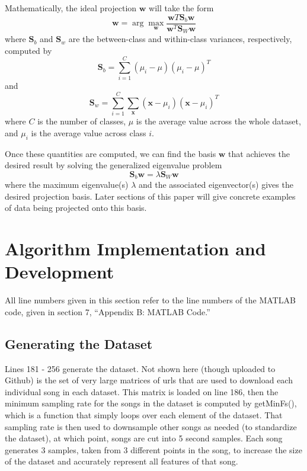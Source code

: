 \documentclass[a4paper,10 pt]{article}
\begin{document}
Mathematically, the ideal projection $\mathbf{w}$ will take the form 
\begin{equation}
    \mathbf{w} = \arg\max_{\mathbf{w}} \frac{\mathbf{w}T\mathbf{S}_b\mathbf{w}}{\mathbf{w}^T\mathbf{S}_W\mathbf{w}}
\end{equation}
where $\mathbf{S}_b$ and $\mathbf{S}_w$ are the between-class and within-class variances, respectively, computed by
\begin{equation}
    \mathbf{S}_b = \sum_{i=1}^C (\mu_i - \mu)(\mu_i - \mu)^T
\end{equation}
and 
\begin{equation}
    \mathbf{S}_w = \sum_{i=1}^C \sum_{\mathbf{x}}(\mathbf{x}-\mu_i)(\mathbf{x}-\mu_i)^T
\end{equation}
where $C$ is the number of classes, $\mu$ is the average value across the whole dataset, and $\mu_i$ is the average value across class $i$.

Once these quantities are computed, we can find the basis $\mathbf{w}$ that achieves the desired result by solving the generalized eigenvalue problem 
\begin{equation}
    \mathbf{S}_b\mathbf{w}=\lambda\mathbf{S}_W\mathbf{w}
\end{equation}
where the maximum eigenvalue(s) $\lambda$ and the associated eigenvector(s) gives the desired projection basis. Later sections of this paper will give concrete examples of data being projected onto this basis.


\section{Algorithm Implementation and Development}
All line numbers given in this section refer to the line numbers of the MATLAB code, given in section 7, ``Appendix B: MATLAB Code.''
\subsection{Generating the Dataset}
Lines 181 - 256 generate the dataset. Not shown here (though uploaded to Github) is the set of very large matrices of urls that are used to download each individual song in each dataset. This matrix is loaded on line 186, then the minimum sampling rate for the songs in the dataset is computed by getMinFs(), which is a function that simply loops over each element of the dataset. That sampling rate is then used to downsample other songs as needed (to standardize the dataset), at which point, songs are cut into 5 second samples. Each song generates 3 samples, taken from 3 different points in the song, to increase the size of the dataset and accurately represent all features of that song.
\end{document}
